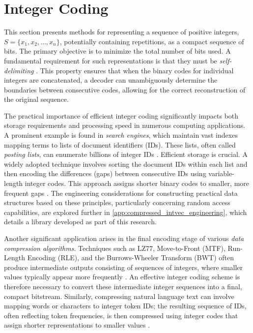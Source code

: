 \section{Integer Coding} \label{sec:integer_coding}

\noindent This section presents methods for representing a sequence of positive integers, $S = \{x_1, x_2, \ldots, x_n\}$, potentially containing repetitions, as a compact sequence of bits. The primary objective is to minimize the total number of bits used. A fundamental requirement for such representations is that they must be \emph{self-delimiting} \cite{witten1999managing}. This property ensures that when the binary codes for individual integers are concatenated, a decoder can unambiguously determine the boundaries between consecutive codes, allowing for the correct reconstruction of the original sequence.

\noindent The practical importance of efficient integer coding significantly impacts both storage requirements and processing speed in numerous computing applications. A prominent example is found in \emph{search engines}, which maintain vast indexes mapping terms to lists of document identifiers (IDs). These lists, often called \emph{posting lists}, can enumerate billions of integer IDs \cite{schutze2008introduction}. Efficient storage is crucial. A widely adopted technique involves sorting the document IDs within each list and then encoding the differences (gaps) between consecutive IDs using variable-length integer codes. This approach assigns shorter binary codes to smaller, more frequent gaps \cite{witten1999managing}. The engineering considerations for constructing practical data structures based on these principles, particularly concerning random access capabilities, are explored further in \autoref{app:compressed_intvec_engineering}, which details a library developed as part of this research.

\noindent Another significant application arises in the final encoding stage of various \emph{data compression algorithms}. Techniques such as LZ77, Move-to-Front (MTF), Run-Length Encoding (RLE), and the Burrows-Wheeler Transform (BWT) often produce intermediate outputs consisting of sequences of integers, where smaller values typically appear more frequently \cite{witten1999managing}. An effective integer coding scheme is therefore necessary to convert these intermediate integer sequences into a final, compact bitstream. Similarly, compressing natural language text can involve mapping words or characters to integer token IDs; the resulting sequence of IDs, often reflecting token frequencies, is then compressed using integer codes that assign shorter representations to smaller values \cite{witten1999managing}.

